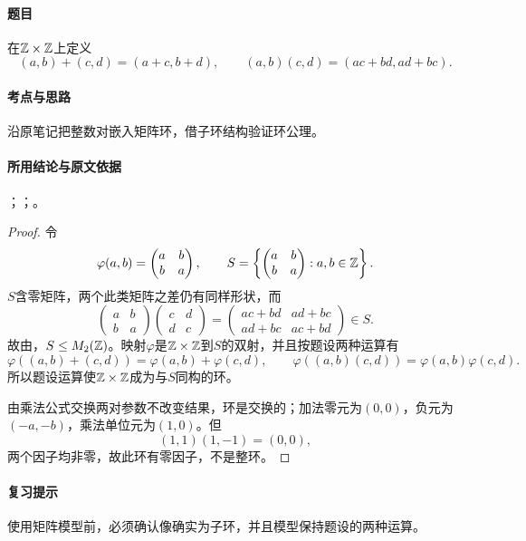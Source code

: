 \paragraph{题目}
在$\mathbb Z\times\mathbb Z$上定义
\[
(a,b)+(c,d)=(a+c,b+d),\qquad(a,b)(c,d)=(ac+bd,ad+bc).
\]

\paragraph{考点与思路}
沿原笔记把整数对嵌入矩阵环，借子环结构验证环公理。

\paragraph{所用结论与原文依据}
；；。


\begin{proof}
令
\[
\varphi(a,b)=\begin{pmatrix}a&b\\b&a\end{pmatrix},\qquad
S=\left\{\begin{pmatrix}a&b\\b&a\end{pmatrix}:a,b\in\mathbb Z\right\}.
\]
$S$含零矩阵，两个此类矩阵之差仍有同样形状，而
\[
\begin{pmatrix}a&b\\b&a\end{pmatrix}
\begin{pmatrix}c&d\\d&c\end{pmatrix}
=\begin{pmatrix}ac+bd&ad+bc\\ad+bc&ac+bd\end{pmatrix}\in S.
\]
故由，$S\leq M_2(\mathbb Z)$。映射$\varphi$是$\mathbb Z\times\mathbb Z$到$S$的双射，并且按题设两种运算有
\[
\varphi((a,b)+(c,d))=\varphi(a,b)+\varphi(c,d),\qquad
\varphi((a,b)(c,d))=\varphi(a,b)\varphi(c,d).
\]
所以题设运算使$\mathbb Z\times\mathbb Z$成为与$S$同构的环。

由乘法公式交换两对参数不改变结果，环是交换的；加法零元为$(0,0)$，负元为$(-a,-b)$，乘法单位元为$(1,0)$。但
\[
(1,1)(1,-1)=(0,0),
\]
两个因子均非零，故此环有零因子，不是整环。
\end{proof}

\paragraph{复习提示}
使用矩阵模型前，必须确认像确实为子环，并且模型保持题设的两种运算。


